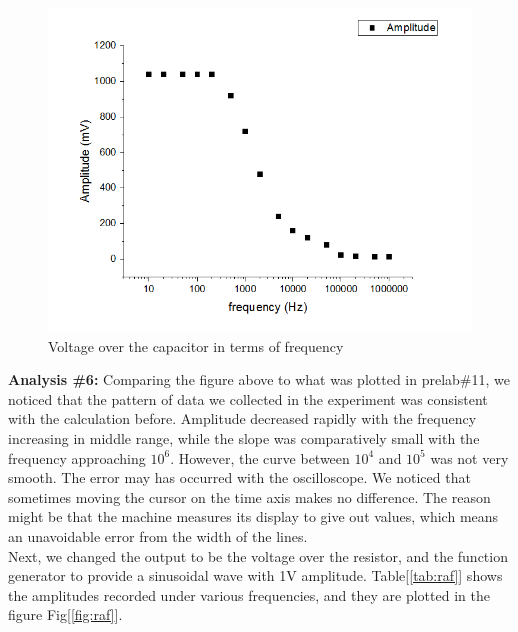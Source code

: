 \begin{figure}[!htbp]
	\centering
	\begin{framed}
	\includegraphics[width=\linewidth]{images/c-amp-freq.png}
	\caption{Voltage over the capacitor in terms of frequency}
		\end{framed}
	\label{fig:caf}
\end{figure}

\hfill \newline
\textbf{Analysis \#6:} \newline
\phantom{ } Comparing the figure above to what was plotted in prelab\#11, we noticed that the pattern of data we collected in the experiment was consistent with the calculation before. Amplitude decreased rapidly with the frequency increasing in middle range, while the slope was comparatively small with the frequency approaching $10^6$. However, the curve between $10^4$ and $10^5$ was not very smooth. The error may has occurred with the oscilloscope. We noticed that sometimes moving the cursor on the time axis makes no difference. The reason might be that the machine measures its display to give out values, which means an unavoidable error from the width of the lines. \\
\phantom{ } Next, we changed the output to be the voltage over the resistor, and the function generator to provide a sinusoidal wave with 1V amplitude. Table[\ref{tab:raf}] shows the amplitudes recorded under various frequencies, and they are plotted in the figure Fig[\ref{fig:raf}].

